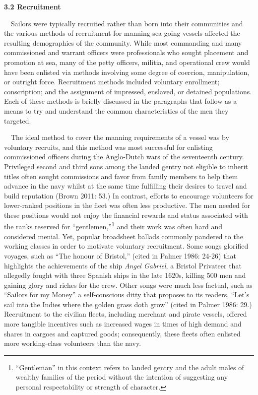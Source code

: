 \begin{styleStandard}
\textbf{3.2 Recruitment}
\end{styleStandard}


\begin{styleStandard}
\ \ Sailors were typically recruited rather than born into their communities and the various methods of recruitment for manning sea-going vessels affected the resulting demographics of the community. While most commanding and many commissioned and warrant officers were professionals who sought placement and promotion at sea, many of the petty officers, militia, and operational crew would have been enlisted via methods involving some degree of coercion, manipulation, or outright force. Recruitment methods included voluntary enrollment; conscription; and the assignment of impressed, enslaved, or detained populations. Each of these methods is briefly discussed in the paragraphs that follow as a means to try and understand the common characteristics of the men they targeted. 
\end{styleStandard}


\begin{styleStandard}
\ \ The ideal method to cover the manning requirements of a vessel was by voluntary recruits, and this method was most successful for enlisting commissioned officers during the Anglo-Dutch wars of the seventeenth century. Privileged second and third sons among the landed gentry not eligible to inherit titles often sought commissions and favor from family members to help them advance in the navy whilst at the same time fulfilling their desires to travel and build reputation (Brown 2011: 53.) In contrast, efforts to encourage volunteers for lower-ranked positions in the fleet was often less productive. The men needed for these positions would not enjoy the financial rewards and status associated with the ranks reserved for “gentlemen,”\footnote{ “Gentleman” in this context refers to landed gentry and the adult males of wealthy families of the period without the intention of suggesting any personal respectability or strength of character. } and their work was often hard and considered menial. Yet, popular broadsheet ballads commonly pandered to the working classes in order to motivate voluntary recruitment. Some songs glorified voyages, such as “The honour of Bristol,” (cited in Palmer 1986: 24-26) that highlights the achievements of the ship \textit{Angel Gabriel}, a Bristol Privateer that allegedly fought with three Spanish ships in the late 1620s, killing 500 men and gaining glory and riches for the crew. Other songs were much less factual, such as “Sailors for my Money” a self-conscious ditty that proposes to its readers, “Let’s sail into the Indies where the golden grass doth grow” (cited in Palmer 1986: 29.) Recruitment to the civilian fleets, including merchant and pirate vessels, offered more tangible incentives such as increased wages in times of high demand and shares in cargoes and captured goods; consequently, these fleets often enlisted more working-class volunteers than the navy. 
\end{styleStandard}



